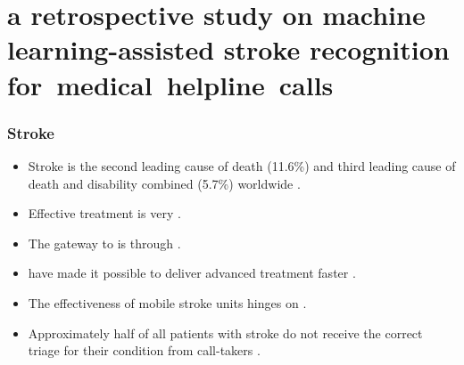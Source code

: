 
\section[A Retrospective Study on Machine Learning-Assisted Stroke Recognition for~Medical~Helpline~Calls]{a retrospective study on machine learning-assisted stroke recognition for~medical~helpline~calls}


\begin{frame}
    \frametitle{Stroke}
    \begin{itemize}
        \item Stroke is the second leading cause of death (11.6\%) and third leading cause of death and disability combined (5.7\%) worldwide \parencite{cite1,cite2,cite3}.
        \item Effective treatment is very  \parencite{cite4,cite5}.
        \item The gateway to  is through .
        \item {} have made it possible to deliver advanced treatment faster \parencite{cite6,cite7}.
        \item The effectiveness of mobile stroke units hinges on  \parencite{cite6,cite7}.
        \item Approximately half of all patients with stroke do not receive the correct triage for their condition from call-takers \parencite{cite10,cite11,cite12}. 
    \end{itemize}

\end{frame}


